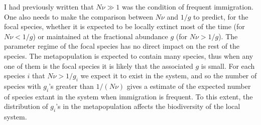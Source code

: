 I had previously written that $N\nu \gg 1$ was the condition of frequent immigration. 
One also needs to make the comparison between $N\nu$ and $1/g$ to predict, for the focal species, whether it is expected to be locally extinct most of the time (for $N\nu<1/g$) or maintained at the fractional abundance $g$ (for $N\nu>1/g$). 
The parameter regime of the focal species has no direct impact on the rest of the species. %
The metapopulation is expected to contain many species, thus when any one of them is the focal species it is likely that the associated $g$ is small. 
For each species $i$ that $N\nu>1/g_i$ we expect it to exist in the system, and so the number of species with $g_i$'s greater than $1/(N\nu)$ gives a estimate of the expected number of species extant in the system when immigration is frequent. 
To this extent, the distribution of $g_i$'s in the metapopulation affects the biodiversity of the local system. 

